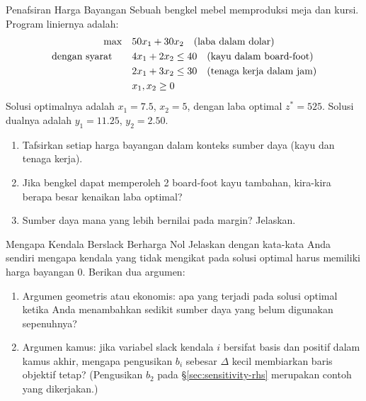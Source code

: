 
\begin{ex}{Penafsiran Harga Bayangan}{}
\label{ex:shadow-price-workshop}
 Sebuah bengkel mebel memproduksi meja dan kursi. Program liniernya adalah:
\[
\begin{aligned}
\max \quad & 50x_1 + 30x_2 \quad \mbox{(laba dalam dolar)}\\
\mbox{dengan syarat}\quad \quad
& 4x_1 + 2x_2 \leq 40 \quad \mbox{(kayu dalam board-foot)} \\
& 2x_1 + 3x_2 \leq 30 \quad \mbox{(tenaga kerja dalam jam)} \\
& x_1, x_2 \geq 0
\end{aligned}
\]
Solusi optimalnya adalah $x_1 = 7.5$, $x_2 = 5$, dengan laba optimal $z^* = 525$. Solusi dualnya adalah $y_1 = 11.25$, $y_2 = 2.50$.

\begin{enumerate}
\item Tafsirkan setiap harga bayangan dalam konteks sumber daya (kayu dan tenaga kerja).
\item Jika bengkel dapat memperoleh 2 board-foot kayu tambahan, kira-kira berapa besar kenaikan laba optimal?
\item Sumber daya mana yang lebih bernilai pada margin? Jelaskan.
\end{enumerate}
\exrefs{\S\ref{sec:sensitivity-rhs}}
\end{ex}

\begin{ex}{Mengapa Kendala Berslack Berharga Nol}{}
 Jelaskan dengan kata-kata Anda sendiri mengapa kendala yang tidak mengikat pada solusi optimal harus memiliki harga bayangan $0$. Berikan dua argumen:
\begin{enumerate}
\item Argumen geometris atau ekonomis: apa yang terjadi pada solusi optimal ketika Anda menambahkan sedikit sumber daya yang belum digunakan sepenuhnya?
\item Argumen kamus: jika variabel slack kendala $i$ bersifat basis dan positif dalam kamus akhir, mengapa pengusikan $b_i$ sebesar $\Delta$ kecil membiarkan baris objektif tetap? (Pengusikan $b_2$ pada \S\ref{sec:sensitivity-rhs} merupakan contoh yang dikerjakan.)
\end{enumerate}
\exrefs{\S\ref{sec:sensitivity-rhs}, \S\ref{sec:sensitivity-overview}}
\end{ex}

